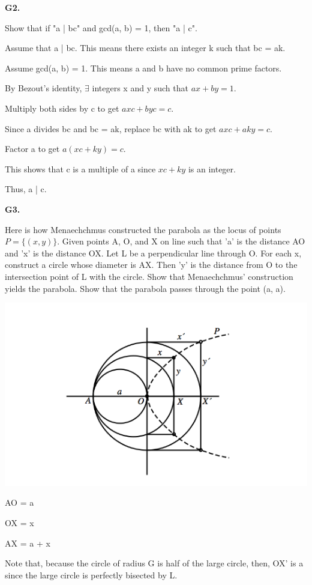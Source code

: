 \documentclass{article}
\begin{document}
\textbf{G2.}

Show that if "a | bc" and gcd(a, b) = 1, then "a | c".

Assume that a | bc. This means there exists an integer k such that bc = ak.

Assume gcd(a, b) = 1. This means a and b have no common prime factors.

By Bezout's identity, $\exists$ integers x and y such that $ax + by = 1$.

Multiply both sides by c to get $axc + byc = c$.

Since a divides bc and bc = ak, replace bc with ak to get $axc + aky = c$.

Factor a to get $a(xc + ky) = c$.

This shows that c is a multiple of a since $xc + ky$ is an integer.

Thus, a | c.

\textbf{G3.}

Here is how Menaechchmus constructed the parabola as the locus of points $P = \{(x,y)\}$.
Given points A, O, and X on line such that 'a' is the distance AO and 'x' is the distance
OX. Let L be a perpendicular line through O. For each x, construct a circle whose diameter
is AX. Then 'y' is the distance from O to the intersection point of L with the circle.
Show that Menaechchmus' construction yields the parabola. Show that the parabola passes
through the point (a, a).

\includegraphics[width=\linewidth]{parabola_construction}

AO = a

OX = x

AX = a + x

Note that, because the circle of radius G is half of the large circle,
then, OX' is a since the large circle is perfectly bisected by L.
\end{document}
